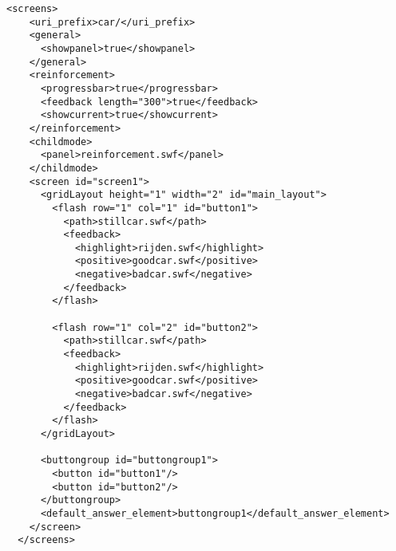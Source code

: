 \begin{lstlisting}
<screens>
    <uri_prefix>car/</uri_prefix>
    <general>
      <showpanel>true</showpanel>
    </general>
    <reinforcement>
      <progressbar>true</progressbar>
      <feedback length="300">true</feedback>
      <showcurrent>true</showcurrent>
    </reinforcement>
    <childmode>
      <panel>reinforcement.swf</panel>
    </childmode>
    <screen id="screen1">
      <gridLayout height="1" width="2" id="main_layout">
        <flash row="1" col="1" id="button1">
          <path>stillcar.swf</path>
          <feedback>
            <highlight>rijden.swf</highlight>
            <positive>goodcar.swf</positive>
            <negative>badcar.swf</negative>
          </feedback>
        </flash>

        <flash row="1" col="2" id="button2">
          <path>stillcar.swf</path>
          <feedback>
            <highlight>rijden.swf</highlight>
            <positive>goodcar.swf</positive>
            <negative>badcar.swf</negative>
          </feedback>
        </flash>
      </gridLayout>

      <buttongroup id="buttongroup1">
        <button id="button1"/>
        <button id="button2"/>
      </buttongroup>
      <default_answer_element>buttongroup1</default_answer_element>
    </screen>
  </screens>
\end{lstlisting}


